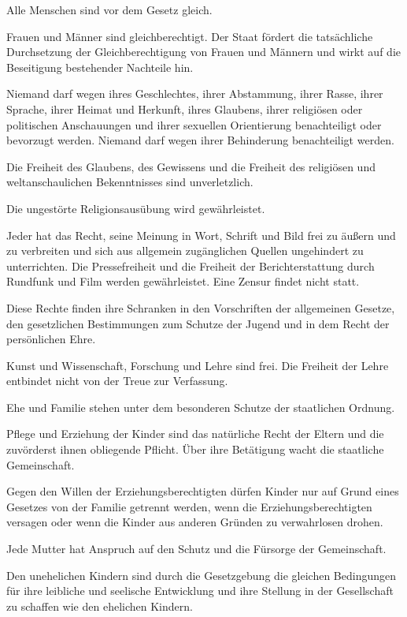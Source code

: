 \documentclass{sasbase}
\begin{document}
\begin{article}
	\item Alle Menschen sind vor dem Gesetz gleich.
	\item Frauen und Männer sind gleichberechtigt. Der Staat fördert die tatsächliche Durchsetzung der Gleichberechtigung von Frauen und Männern und wirkt auf die Beseitigung bestehender Nachteile hin.
	\item Niemand darf wegen ihres Geschlechtes, ihrer Abstammung, ihrer Rasse, ihrer Sprache, ihrer Heimat und Herkunft, ihres Glaubens, ihrer religiösen oder politischen Anschauungen und ihrer sexuellen Orientierung benachteiligt oder bevorzugt werden. Niemand darf wegen ihrer Behinderung benachteiligt werden.
\end{article}

\begin{article}[Religionsfreiheit]
	\item Die Freiheit des Glaubens, des Gewissens und die Freiheit des religiösen und weltanschaulichen Bekenntnisses sind unverletzlich.	
	\item Die ungestörte Religionsausübung wird gewährleistet.
\end{article}

\begin{article}[Meinungsfreiheit]
	\item Jeder hat das Recht, seine Meinung in Wort, Schrift und Bild frei zu äußern und zu verbreiten und sich aus allgemein zugänglichen Quellen ungehindert zu unterrichten. Die Pressefreiheit und die Freiheit der Berichterstattung durch Rundfunk und Film werden gewährleistet. Eine Zensur findet nicht statt.
	\item Diese Rechte finden ihre Schranken in den Vorschriften der allgemeinen Gesetze, den gesetzlichen Bestimmungen zum Schutze der Jugend und in dem Recht der persönlichen Ehre.
	\item Kunst und Wissenschaft, Forschung und Lehre sind frei. Die Freiheit der Lehre entbindet nicht von der Treue zur Verfassung.
\end{article}

\begin{article}
	\item Ehe und Familie stehen unter dem besonderen Schutze der staatlichen Ordnung.
	\item Pflege und Erziehung der Kinder sind das natürliche Recht der Eltern und die zuvörderst ihnen obliegende Pflicht. Über ihre Betätigung wacht die staatliche Gemeinschaft.
	\item Gegen den Willen der Erziehungsberechtigten dürfen Kinder nur auf Grund eines Gesetzes von der Familie getrennt werden, wenn die Erziehungsberechtigten versagen oder wenn die Kinder aus anderen Gründen zu verwahrlosen drohen.
	\item Jede Mutter hat Anspruch auf den Schutz und die Fürsorge der Gemeinschaft.
	\item Den unehelichen Kindern sind durch die Gesetzgebung die gleichen Bedingungen für ihre leibliche und seelische Entwicklung und ihre Stellung in der Gesellschaft zu schaffen wie den ehelichen Kindern.
\end{article}
\end{document}
